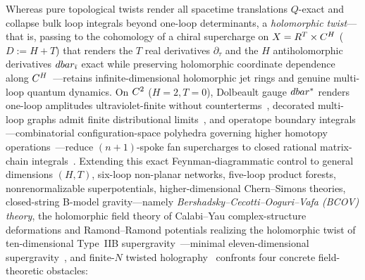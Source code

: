 Whereas pure topological twists render all spacetime translations $Q$-exact and collapse bulk loop integrals beyond one-loop determinants, a \emph{holomorphic twist}---that is, passing to the cohomology of a chiral supercharge on $X = R^T \times C^H$ ($D := H + T$) that renders the $T$ real derivatives $\partial_\tau$ and the $H$ antiholomorphic derivatives $dbar_{\bar{\imath}}$ exact while preserving holomorphic coordinate dependence along $C^H$~\cite{CostelloNotes,CDG20,ESW}---retains infinite-dimensional holomorphic jet rings and genuine multi-loop quantum dynamics. On $C^2$ ($H=2, T=0$), Dolbeault gauge $dbar^*$ renders one-loop amplitudes ultraviolet-finite without counterterms~\cite{Williams,CG2}, decorated multi-loop graphs admit finite distributional limits~\cite{Wang}, and operatope boundary integrals---combinatorial configuration-space polyhedra governing higher homotopy operations~\cite{BGKWY,GKW}---reduce $(n+1)$-spoke fan supercharges to closed rational matrix-chain integrals~\cite{GWW,LLC}. Extending this exact Feynman-diagrammatic control to general dimensions $(H,T)$, six-loop non-planar networks, five-loop product forests, nonrenormalizable superpotentials, higher-dimensional Chern--Simons theories, closed-string B-model gravity---namely \emph{Bershadsky--Cecotti--Ooguri--Vafa (BCOV) theory}, the holomorphic field theory of Calabi--Yau complex-structure deformations and Ramond--Ramond potentials realizing the holomorphic twist of ten-dimensional Type~IIB supergravity~\cite{BCOV94,CL19}---minimal eleven-dimensional supergravity~\cite{CJS78,RSW21}, and finite-$N$ twisted holography~\cite{CG18,BG26} confronts four concrete field-theoretic obstacles:
